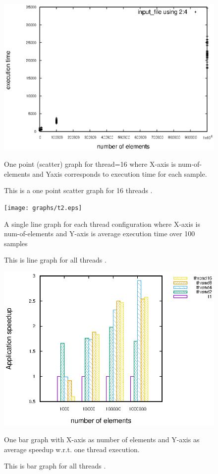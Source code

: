 \documentclass{article}
\begin{document}
\begin{figure}
\centering
\includegraphics{graphs/16_t1.eps}
\vspace{60pt}
 \caption{This is a one point scatter graph for 16 threads .}
 \vspace{30pt}
 One point (scatter) graph for thread=16 where X-axis is num-of-elements and Yaxis
 corresponds to execution time for each sample.
 \label{fig:16_t1}
\end{figure}




\begin{figure}
\centering
\texttt{[image: graphs/t2.eps]}
\vspace{60pt}
 \caption{This is line graph for all threads .}
 \vspace{30pt}
 A single line graph for each thread configuration where X-axis is num-of-elements and Y-axis is
 average execution time over 100 samples
 \label{fig:t2}
\end{figure}



\begin{figure}
\centering
\includegraphics{graphs/t3.eps}
\vspace{60pt}
 \caption{This is bar graph for all threads .}
 \vspace{30pt}
 One bar graph with X-axis as number of elements and Y-axis as average speedup  w.r.t. one thread execution.
 \label{fig:t4}
\end{figure}
\end{document}
